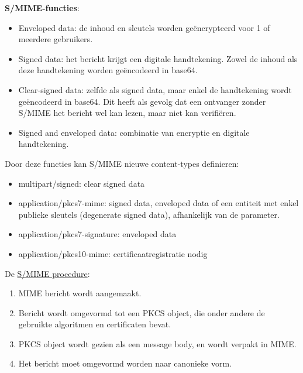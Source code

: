\documentclass{report}
\begin{document}
	\textbf{S/MIME-functies}:
	\begin{itemize}
		\item[\info] Enveloped data: de inhoud en sleutels worden geëncrypteerd voor 1 of meerdere gebruikers.
		\item[\info] Signed data: het bericht krijgt een digitale handtekening. Zowel de inhoud als deze handtekening worden geëncodeerd in base64.
		\item[\info] Clear-signed data: zelfde als signed data, maar enkel de handtekening wordt geëncodeerd in base64. Dit heeft als gevolg dat een ontvanger zonder S/MIME het bericht wel kan lezen, maar niet kan verifiëren.
		\item[\info] Signed and enveloped data: combinatie van encryptie en digitale handtekening.
	\end{itemize}
	Door deze functies kan S/MIME nieuwe content-types definieren:
	\begin{itemize}
		\item[\info] multipart/signed: clear signed data
		\item[\info] application/pkcs7-mime: signed data, enveloped data of een entiteit met enkel publieke sleutels (degenerate signed data), afhankelijk van de parameter.
		\item[\info] application/pkcs7-signature: enveloped data
		\item[\info] application/pkcs10-mime: certificaatregistratie nodig
	\end{itemize}

	De \underline{S/MIME procedure}:
	\begin{enumerate}
		\item MIME bericht wordt aangemaakt.
		\item Bericht wordt omgevormd tot een PKCS object, die onder andere de gebruikte algoritmen en certificaten bevat.
		\item PKCS object wordt gezien als een message body, en wordt verpakt in MIME.
		\item Het bericht moet omgevormd worden naar canonieke vorm.
	\end{enumerate}
\end{document}
